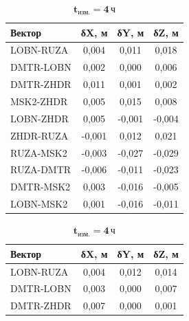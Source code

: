 \begin{table}		
	\ContinuedFloat
	\centering\small
	\begin{subtable}{.47\linewidth}	
		\centering
		\caption*{$\mathbf{t_\text{изм.}=3\,\text{ч}}$}
		\begin{tabular}{ l
				S[table-number-alignment = center]
				S[table-number-alignment = center]
				S[table-number-alignment = center] }
			
			
			\hline
			\textbf{Вектор}				& \textbf{δX, м}	& \textbf{δY, м}	& \textbf{δZ, м}	\\ \hline
			LOBN-RUZA					&      0,004		& 	   0,011		&      0,018		\\ %
			DMTR-LOBN					&      0,002		&      0,000		&     0,006			\\ %
			DMTR-ZHDR					&      0,011		&      0,001		&      0,002		\\ %
			MSK2-ZHDR					&      0,005		&      0,015		&      0,008		\\ %
			LOBN-ZHDR					&      0,005		&     -0,001		&     -0,004		\\ %
			ZHDR-RUZA					&     -0,001		&      0,012		&      0,021		\\ %
			RUZA-MSK2					&     -0,003		&     -0,027		&     -0,029		\\ %
			RUZA-DMTR					&     -0,006		&     -0,011		&     -0,023		\\ %
			DMTR-MSK2					&      0,003		&     -0,016		&     -0,005		\\ %
			LOBN-MSK2					&      0,001		&     -0,016		&     -0,011		\\ \hline				
		\end{tabular}
	\end{subtable}%
	\qquad
	\begin{subtable}{.47\linewidth}	
		\centering
		\caption*{$\mathbf{t_\text{изм.}=4\,\text{ч}}$}
		\begin{tabular}{ l
				S[table-number-alignment = center]
				S[table-number-alignment = center]
				S[table-number-alignment = center] }
			\hline
			\textbf{Вектор}				& \textbf{δX, м}	& \textbf{δY, м}	& \textbf{δZ, м}	\\ \hline
			LOBN-RUZA					&      0,004		& 	   0,012		&      0,014		\\ %
			DMTR-LOBN					&      0,003		&      0,000		&      0,007		\\ %
			DMTR-ZHDR					&      0,007		&      0,000		&      0,001		\\ %

\end{tabular}
\end{subtable}
\end{table}

